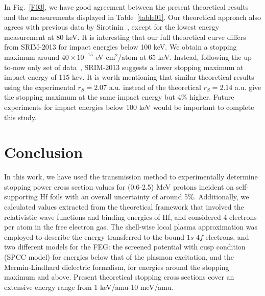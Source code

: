 \documentclass[aps,pra,reprint,groupedaddress]{revtex4-1}
\begin{document}
In Fig.~\ref{F03}, we have good agreement between the present theoretical results and the measurements displayed in Table~\ref{table01}. Our theoretical approach also agrees with previous data by Sirotinin~\cite{Sirotinin}, except for the lowest energy measurement at 80 keV. It is interesting that our full theoretical curve differs from SRIM-2013 for impact energies below 100 keV. We obtain a stopping maximum around $40 \times 10^{-15}$ eV cm$^2$/atom  at 65 keV. Instead, following the up-to-now only set of data~\cite{Sirotinin}, SRIM-2013 suggests a lower stopping maximum  at impact energy of 115 kev. It is worth mentioning that similar theoretical results using the experimental $r_S=2.07$ a.u. instead of the theoretical $r_S=2.14$ a.u. give the stopping maximum at the same impact energy but $4\%$ higher. Future experiments for
impact energies below 100 keV would be important to complete this study.


\section{Conclusion}
\label{conclusion}
In this work, we have used the transmission method to experimentally determine stopping power cross section values for (0.6-2.5) MeV protons incident on self-supporting Hf foils with an overall uncertainty of around 5\%. Additionally, we calculated values extracted from the theoretical framework that involved the relativistic wave functions and binding energies of Hf, and considered 4 electrons per atom in the free electron gas. The shell-wise local plasma approximation was employed to describe the energy transferred to the bound $1s$-$4f$ electrons, and two different models for the FEG: the screened potential with cusp condition (SPCC model) for energies below that of the plasmon excitation, and the Mermin-Lindhard dielectric formalism, for energies around the stopping maximum and above. Present theoretical stopping cross sections cover an extensive energy range from 1 keV/amu-10 meV/amu.
\end{document}
